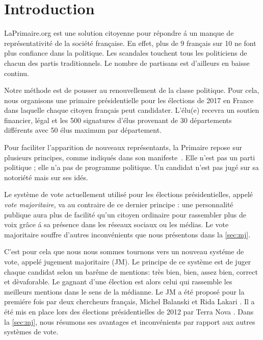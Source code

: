 \documentclass[conference]{IEEEtran}
\begin{document}



\section{Introduction}
\label{sec:intro}


LaPrimaire.org est une solution citoyenne pour r\'epondre \'a un manque de repr\'esentativit\'e de la soci\'et\'e fran\c{c}aise. En effet, plus de 9 fran\c{c}ais sur 10 ne font plus confiance dans la politique. Les scandales touchent tous les politiciens de chacun des partis traditionnels. Le nombre de partisans est d'ailleurs en baisse continu.


Notre m\'ethode est de pousser au renouvellement de la classe politique. Pour cela, nous organisons une primaire pr\'esidentielle pour les \'elections de 2017 en France dans laquelle chaque citoyen fran\c{c}ais peut candidater. L'\'elu(e) recevra un soutien financier, l\'egal et les 500 signatures d'\'elus provenant de 30 d\'epartements diff\'erents avec 50 \'elus maximum par d\'epartement.

Pour faciliter l'apparition de nouveaux repr\'esentants, la Primaire repose sur plusieurs principes, comme indiqu\'es dans son manifeste~\cite{manifeste}. Elle n'est pas un parti politique ; elle n'a pas de programme politique. Un candidat n'est pas jug\'e sur sa notori\'et\'e mais sur ses id\'es.

Le syst\`eme de vote actuellement utilis\'e pour les \'elections pr\'esidentielles, appel\'e \emph{vote majoritaire}, va au contraire de ce dernier principe : une personnalit\'e publique aura plus de facilit\'e qu'un citoyen ordinaire pour rassembler plus de voix gr\^ace \'a sa pr\'esence dans les r\'eseaux sociaux ou les m\'edias. Le vote majoritaire souffre d'autres inconv\'enients que nous pr\'esentons dans la \cref{sec:mj}. 

C'est pour cela que nous nous sommes tournons vers un nouveau syst\'eme de vote, appel\'e jugement majoritaire (JM). Le principe de ce syst\`eme est de juger chaque candidat selon un bar\^eme de mentions: tr\`es bien, bien, assez bien, correct et d\`evaforable. Le gagnant d'une \'election est alors celui qui rassemble les meilleurs mentions dans le sens de la m\'edianne.  Le JM a \'et\'e propos\'e pour la premi\'ere fois par deux chercheurs fran\c{c}ais, Michel Balanski et Rida Lakari \cite{mj}.  Il a \'et\'e mis en place lors des \'elections pr\'esidentielles de 2012 par Terra Nova \cite{terra-nova}. Dans la \cref{sec:mj}, nous r\'esumons ses avantages et inconv\'enients par rapport aux autres syst\`emes de vote. 
\end{document}

